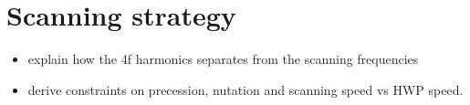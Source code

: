 
\section{Scanning strategy}

\begin{itemize}
\item explain how the 4f harmonics separates from the scanning frequencies
\item derive constraints on precession, nutation and scanning speed vs HWP speed.
\end{itemize}
